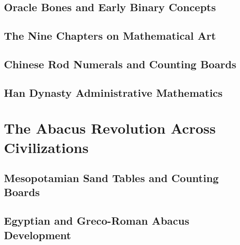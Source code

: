 \documentclass[12pt, oneside, openany]{book}
\begin{document}
\section{Oracle Bones and Early Binary Concepts}

\section{The Nine Chapters on Mathematical Art}

\section{Chinese Rod Numerals and Counting Boards}

\section{Han Dynasty Administrative Mathematics}


\chapter{The Abacus Revolution Across Civilizations}

\section{Mesopotamian Sand Tables and Counting Boards}

\section{Egyptian and Greco-Roman Abacus Development}
\end{document}
